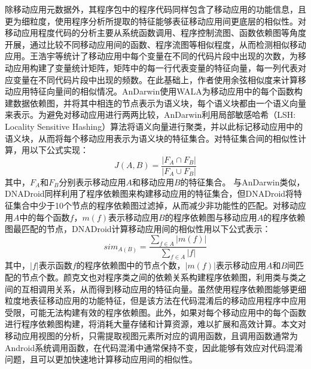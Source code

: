 除移动应用元数据外，其程序包中的程序代码同样包含了移动应用的功能信息，且更为细粒度，使用程序分析所提取的特征能够表征移动应用间更底层的相似性。对移动应用程度代码的分析主要从系统函数调用、程序控制流图、函数依赖图\cite{cheng2014class}等角度开展，通过比较不同移动应用间的函数、程序流图等相似程度，从而检测相似移动应用。王浩宇等\cite{wang2014detecting}统计了移动应用中每个变量在不同的代码片段中出现的次数，为移动应用构建了变量统计矩阵，矩阵中的每一行代表变量的特征向量，每一列代表对应变量在不同代码片段中出现的频数。在此基础上，作者使用余弦相似度来计算移动应用特征向量间的相似情况。AnDarwin\cite{crussell2015andarwin}使用WALA\cite{wala}为移动应用中的每个函数构建数据依赖图，并将其中相连的节点表示为语义块，每个语义块都由一个语义向量来表示。为避免对移动应用进行两两比较，AnDarwin利用局部敏感哈希（LSH: Locality Sensitive Hashing）\cite{andoni2006near}算法将语义向量进行聚类，并以此标记移动应用中的语义块，从而将每个移动应用表示为语义块的特征集合。对特征集合间的相似性计算，用以下公式实现：
\begin{equation}
J(A, B) = \frac{|F_A \cap F_B|}{|F_A \cup F_B|}
\end{equation}
其中，$F_A$和$F_B$分别表示移动应用$A$和移动应用$B$的特征集合。
与AnDarwin类似，DNADroid\cite{crussell2012attack}同样利用了程序依赖图来构建移动应用的特征集合，但DNADroid将特征集合中少于10个节点的程序依赖图过滤掉，从而减少非功能性的匹配。对移动应用$A$中的每个函数$f$，$m(f)$表示移动应用$B$的程序依赖图与移动应用$A$的程序依赖图最匹配的节点，DNADroid计算移动应用间的相似性用以下公式表示：
\begin{equation}
sim_{A(B)} = \frac{\sum_{f \in A} |m(f)|}{\sum_{f \in A} |f|}
\end{equation}
其中，$|f|$表示函数$f$的程序依赖图中的节点个数，$|m(f)|$表示移动应用$A$和$B$间匹配的节点个数。颜克文\cite{yan2014graph}也对程序类之间的依赖关系构建程序依赖图，利用类与类之间的互相调用关系，从而得到移动应用的特征向量。虽然使用程序依赖图能够更细粒度地表征移动应用的功能特征，但是该方法在代码混淆后的移动应用程序中应用受限，可能无法构建有效的程序依赖图。此外，如果对每个移动应用中的每个函数进行程序依赖图构建，将消耗大量存储和计算资源，难以扩展和高效计算。本文对移动应用视图的分析，只需提取视图元素所对应的调用函数，且调用函数通常为Android系统调用函数，在代码混淆中通常保持不变，因此能够有效应对代码混淆问题，且可以更加快速地计算移动应用间的相似性。



